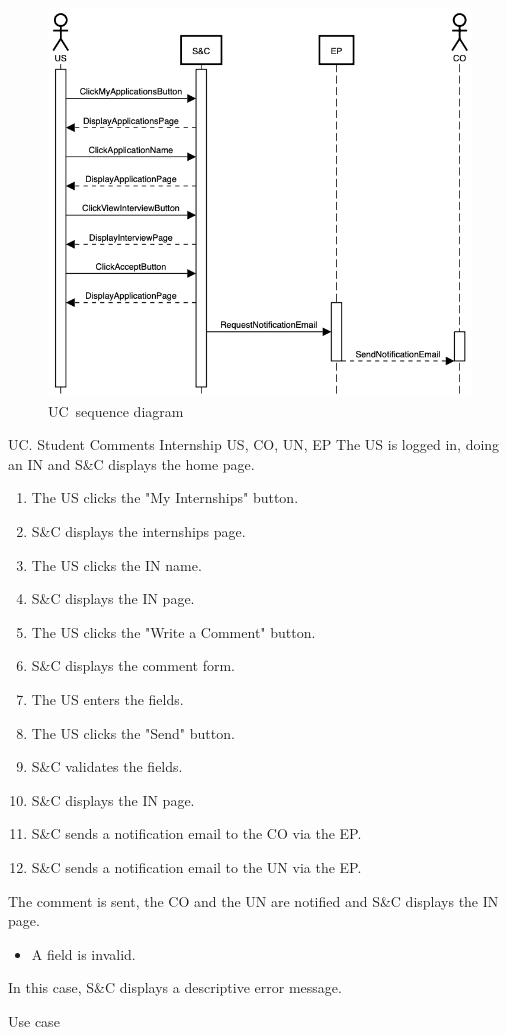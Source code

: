\begin{figure}
    \centering
    \includegraphics[width=14cm]{images/sequence-diagrams/student-accepts-interview.png}
    \caption{UC\theuc\ sequence diagram}
\end{figure}


\clearpage
\begin{usecase}
    {UC\theuc. Student Comments Internship}
    {US, CO, UN, EP}
    {The US is logged in, doing an IN and S\&C displays the home page.}
    {\begin{enumerate}[leftmargin=*]
        \item The US clicks the "My Internships" button.
        \item S\&C displays the internships page.
        \item The US clicks the IN name.
        \item S\&C displays the IN page.
        \item The US clicks the "Write a Comment" button.
        \item S\&C displays the comment form.
        \item The US enters the fields.
        \item The US clicks the "Send" button.
        \item S\&C validates the fields.
        \item S\&C displays the IN page.
        \item S\&C sends a notification email to the CO via the EP.
        \item S\&C sends a notification email to the UN via the EP.
    \end{enumerate}}
    {The comment is sent, the CO and the UN are notified and S\&C displays the IN page.}
    {\begin{itemize}[leftmargin=*, label=\tiny\textbullet]
        \item A field is invalid.
    \end{itemize}
    In this case, S\&C displays a descriptive error message.}
    {Use case \theuc}
\end{usecase}

